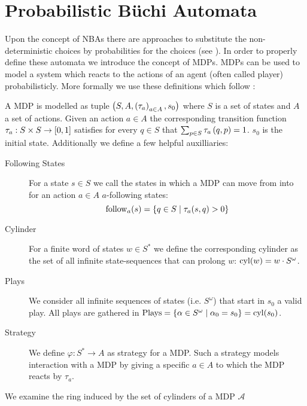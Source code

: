 \section{Probabilistic Büchi Automata}
Upon the concept of \acp{NBA} there are approaches to substitute the
non-deterministic choices by probabilities for the choices
(see \cite{RecOmeLangProbAuto,DecProblemsForProbAuto,Groesser}). In order to
properly define these automata we introduce the concept of \aclp{MDP}.
\aclp*{MDP} can be used to model a system which reacts to the actions of an
agent (often called player) probabilisticly.
More formally we use these definitions which follow \cite{RandAutoInfTrees}:
\begin{definition}
  A \acl*{MDP} is modelled as tuple
  $\left(S, A, \left(\tau_{a}\right)_{a\in A}, s_{0}\right)$ where $S$ is a set of states
  and $A$ a set of actions. Given an action $a\in A$ the corresponding
  transition function $\tau_{a}:S\times S\rightarrow \left[0,1\right]$ satisfies
  for every $q\in S$ that $\sum_{p\in S}\tau_{a}\left(q,p\right) = 1$.
  $s_{0}$ is the initial state. Additionally we define a few helpful
  auxilliaries:
  \begin{description}
    \item [Following States] For a state $s\in S$ we call the states in which a
      \ac{MDP} can move from into for an action $a\in A$ $a$-following states:
      \begin{equation*}
        \operatorname{follow}_{a}(s) = \left\{q\in S\mid \tau_{a}(s,q) > 0\right\}
      \end{equation*}
    \item [Cylinder] For a finite word of states $w\in S^{*}$ we define the
      corresponding cylinder as the set of all infinite state-sequences
      that can prolong $w$: $\operatorname{cyl}(w) = w\cdot S^{\omega}$.
    \item [Plays] We consider all infinite sequences of states
      (i.e. $S^{\omega}$) that start in $s_{0}$ a valid play. All plays
      are gathered in $\operatorname{Plays} = \left\{
        \alpha\in S^{\omega}\mid \alpha_{0} = s_{0}\right\} = \operatorname{cyl}(s_{0})$.
    \item [Strategy] We define $\varphi:S^{*}\rightarrow A$ as strategy for
      a \ac{MDP}. Such a strategy models interaction with a \ac{MDP} by
      giving a specific $a\in A$ to which the \ac{MDP} reacts by $\tau_{a}$.
  \end{description}
  \label{def:mdp}
\end{definition}
We examine the ring induced by the set of cylinders of a \ac{MDP} $\mathcal{A}$
